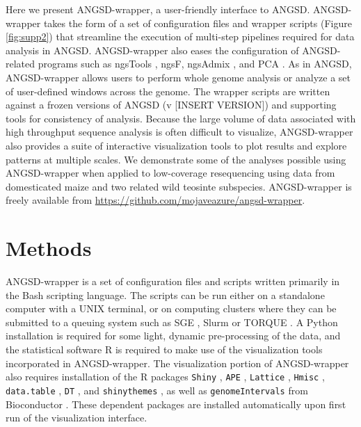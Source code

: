 \documentclass[10pt,a4paper]{article}
\begin{document}
Here we present ANGSD-wrapper, a user-friendly interface to ANGSD. 
ANGSD-wrapper takes the form of a set of configuration files and wrapper scripts (Figure \ref{fig:supp2}) that streamline the execution of multi-step pipelines required for data analysis in ANGSD. 
ANGSD-wrapper also eases the configuration of ANGSD-related programs such as ngsTools \citep{fumagalli2014ngstools}, ngsF\citep{vieira2013estimating}, ngsAdmix \citep{pmid24026093}, and PCA \citep{fumagalli2013quantifying}. 
As in ANGSD, ANGSD-wrapper allows users to perform whole genome analysis or analyze a set of user-defined windows across the genome.
The wrapper scripts are written against a frozen versions of ANGSD (v [INSERT VERSION]) and supporting tools for consistency of analysis. 
Because the large volume of data associated with high throughput sequence analysis is often difficult to visualize, ANGSD-wrapper also provides a suite of interactive visualization tools to plot results and explore patterns at multiple scales.  
We demonstrate some of the analyses possible using ANGSD-wrapper when applied to low-coverage resequencing using data from domesticated maize and two related wild teosinte subspecies. 
ANGSD-wrapper is freely available from \url{https://github.com/mojaveazure/angsd-wrapper}.

\section*{Methods}
ANGSD-wrapper is a set of configuration files and scripts written primarily in the Bash scripting language. 
The scripts can be run either on a standalone computer with a UNIX terminal, or on computing clusters where they can be submitted to a queuing system such as SGE \citep{Microsystems):2001:SGE:560889.792378}, Slurm \citep{Jette02slurm:simple} or TORQUE \citep{Staples:2006:TRM:1188455.1188464}. 
A Python installation \citep{Python} is required for some light, dynamic pre-processing of the data, and the statistical software R \citep{Rcitation} is required to make use of the visualization tools incorporated in ANGSD-wrapper.  
The visualization portion of ANGSD-wrapper also requires installation of the R packages \texttt{Shiny} \citep{shiny}, \texttt{APE} \citep{APE}, \texttt{Lattice} \citep{lattice}, \texttt{Hmisc} \citep{Hmisc}, \texttt{data.table} \citep{datatable}, \texttt{DT} \citep{javascriptDT}, and \texttt{shinythemes} \citep{shinythemes}, as well as \texttt{genomeIntervals} \citep{genomeIntervals} from Bioconductor \citep{bioconductor}.
These dependent packages are installed automatically upon first run of the visualization interface.
\end{document}

